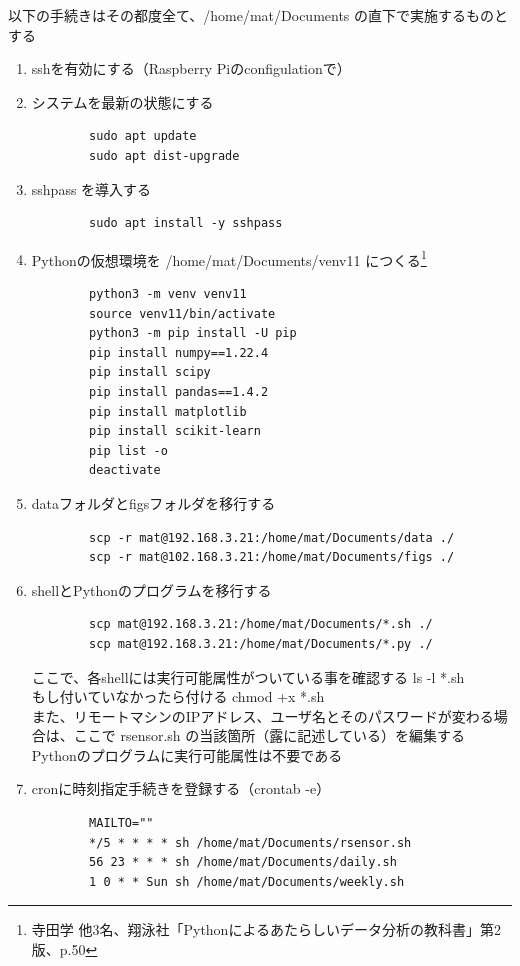\documentclass[12pt,a4paper,uplatex]{jsarticle}
\begin{document}
以下の手続きはその都度全て、/home/mat/Documents の直下で実施するものとする

\begin{enumerate}
	\item sshを有効にする（Raspberry Piのconfigulationで）
	\item システムを最新の状態にする
	\begin{verbatim}
		sudo apt update
		sudo apt dist-upgrade
	\end{verbatim}
	\item sshpass を導入する
	\begin{verbatim}
		sudo apt install -y sshpass 
	\end{verbatim}
	\item Pythonの仮想環境を /home/mat/Documents/venv11 につくる\footnote{寺田学 他3名、翔泳社「Pythonによるあたらしいデータ分析の教科書」第2版、p.50}
	\begin{verbatim}
		python3 -m venv venv11
		source venv11/bin/activate
		python3 -m pip install -U pip
		pip install numpy==1.22.4
		pip install scipy
		pip install pandas==1.4.2
		pip install matplotlib
		pip install scikit-learn
		pip list -o
		deactivate
	\end{verbatim}
	\item dataフォルダとfigsフォルダを移行する
	\begin{verbatim}
		scp -r mat@192.168.3.21:/home/mat/Documents/data ./
		scp -r mat@102.168.3.21:/home/mat/Documents/figs ./
	\end{verbatim}
	\item shellとPythonのプログラムを移行する
	\begin{verbatim}
		scp mat@192.168.3.21:/home/mat/Documents/*.sh ./
		scp mat@192.168.3.21:/home/mat/Documents/*.py ./
	\end{verbatim}
	ここで、各shellには実行可能属性がついている事を確認する ls -l *.sh\\
	もし付いていなかったら付ける chmod +x *.sh\\
	また、リモートマシンのIPアドレス、ユーザ名とそのパスワードが変わる場合は、ここで rsensor.sh の当該箇所（露に記述している）を編集する\\
	Pythonのプログラムに実行可能属性は不要である
	\item cronに時刻指定手続きを登録する（crontab -e）
	\begin{verbatim}
		MAILTO=""
		*/5 * * * * sh /home/mat/Documents/rsensor.sh
		56 23 * * * sh /home/mat/Documents/daily.sh
		1 0 * * Sun sh /home/mat/Documents/weekly.sh
	\end{verbatim}

\end{enumerate}
\end{document}
